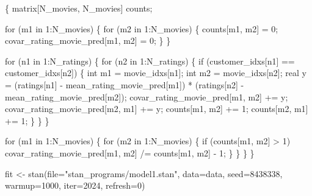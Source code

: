 \documentclass[
  letterpaper,
  DIV=11,
  numbers=noendperiod]{scrartcl}
\newenvironment{Shaded}{\begin{snugshade}}{\end{snugshade}}
\newcommand{\AttributeTok}[1]{\textcolor[rgb]{0.40,0.45,0.13}{#1}}
\newcommand{\ControlFlowTok}[1]{\textcolor[rgb]{0.00,0.23,0.31}{#1}}
\newcommand{\DataTypeTok}[1]{\textcolor[rgb]{0.68,0.00,0.00}{#1}}
\newcommand{\DecValTok}[1]{\textcolor[rgb]{0.68,0.00,0.00}{#1}}
\newcommand{\FunctionTok}[1]{\textcolor[rgb]{0.28,0.35,0.67}{#1}}
\newcommand{\NormalTok}[1]{\textcolor[rgb]{0.00,0.23,0.31}{#1}}
\newcommand{\OtherTok}[1]{\textcolor[rgb]{0.00,0.23,0.31}{#1}}
\newcommand{\StringTok}[1]{\textcolor[rgb]{0.13,0.47,0.30}{#1}}
\begin{document}
\begin{codelisting}
\begin{Shaded}
\begin{Highlighting}[]
\NormalTok{  \{}
    \DataTypeTok{matrix}\NormalTok{[N\_movies, N\_movies] counts;}

    \ControlFlowTok{for}\NormalTok{ (m1 }\ControlFlowTok{in} \DecValTok{1}\NormalTok{:N\_movies) \{}
      \ControlFlowTok{for}\NormalTok{ (m2 }\ControlFlowTok{in} \DecValTok{1}\NormalTok{:N\_movies) \{}
\NormalTok{        counts[m1, m2] = }\DecValTok{0}\NormalTok{;}
\NormalTok{        covar\_rating\_movie\_pred[m1, m2] = }\DecValTok{0}\NormalTok{;}
\NormalTok{      \}}
\NormalTok{    \}}

    \ControlFlowTok{for}\NormalTok{ (n1 }\ControlFlowTok{in} \DecValTok{1}\NormalTok{:N\_ratings) \{}
      \ControlFlowTok{for}\NormalTok{ (n2 }\ControlFlowTok{in} \DecValTok{1}\NormalTok{:N\_ratings) \{}
        \ControlFlowTok{if}\NormalTok{ (customer\_idxs[n1] == customer\_idxs[n2]) \{}
          \DataTypeTok{int}\NormalTok{ m1 = movie\_idxs[n1];}
          \DataTypeTok{int}\NormalTok{ m2 = movie\_idxs[n2];}
          \DataTypeTok{real}\NormalTok{ y =   (ratings[n1] {-} mean\_rating\_movie\_pred[m1])}
\NormalTok{                   * (ratings[n2] {-} mean\_rating\_movie\_pred[m2]);}
\NormalTok{          covar\_rating\_movie\_pred[m1, m2] += y;}
\NormalTok{          covar\_rating\_movie\_pred[m2, m1] += y;}
\NormalTok{          counts[m1, m2] += }\DecValTok{1}\NormalTok{;}
\NormalTok{          counts[m2, m1] += }\DecValTok{1}\NormalTok{;}
\NormalTok{        \}}
\NormalTok{      \}}
\NormalTok{    \}}

    \ControlFlowTok{for}\NormalTok{ (m1 }\ControlFlowTok{in} \DecValTok{1}\NormalTok{:N\_movies) \{}
      \ControlFlowTok{for}\NormalTok{ (m2 }\ControlFlowTok{in} \DecValTok{1}\NormalTok{:N\_movies) \{}
        \ControlFlowTok{if}\NormalTok{ (counts[m1, m2] \textgreater{} }\DecValTok{1}\NormalTok{)}
\NormalTok{          covar\_rating\_movie\_pred[m1, m2] /= counts[m1, m2] {-} }\DecValTok{1}\NormalTok{;}
\NormalTok{      \}}
\NormalTok{    \}}
\NormalTok{  \}}
\NormalTok{\}}
\end{Highlighting}
\end{Shaded}

\end{codelisting}

\begin{Shaded}
\begin{Highlighting}[]
\NormalTok{fit }\OtherTok{\textless{}{-}} \FunctionTok{stan}\NormalTok{(}\AttributeTok{file=}\StringTok{"stan\_programs/model1.stan"}\NormalTok{,}
            \AttributeTok{data=}\NormalTok{data, }\AttributeTok{seed=}\DecValTok{8438338}\NormalTok{,}
            \AttributeTok{warmup=}\DecValTok{1000}\NormalTok{, }\AttributeTok{iter=}\DecValTok{2024}\NormalTok{, }\AttributeTok{refresh=}\DecValTok{0}\NormalTok{)}
\end{Highlighting}
\end{Shaded}
\end{document}
